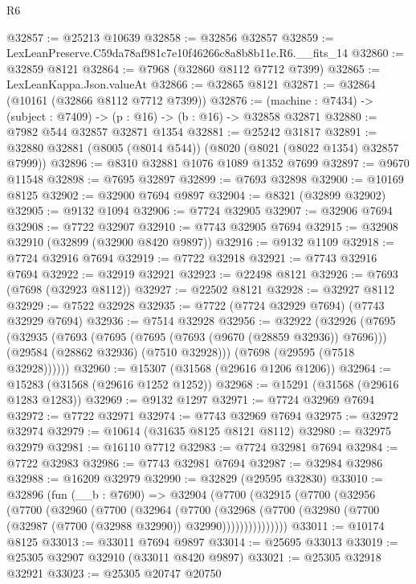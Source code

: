 \begin{lexlean}{R6}
\begin{coremodule}
@32857 := @25213 @10639
@32858 := @32856 @32857
@32859 := LexLeanPreserve.C59da78af981c7e10f46266c8a8b8b11e.R6.__fits_14
@32860 := @32859 @8121
@32864 := @7968 (@32860 @8112 @7712 @7399)
@32865 := LexLeanKappa.Json.valueAt
@32866 := @32865 @8121
@32871 := @32864 (@10161 (@32866 @8112 @7712 @7399))
@32876 := (machine : @7434) -> (subject : @7409) -> (p : @16) -> (b : @16) -> @32858 @32871
@32880 := @7982 @544 @32857 @32871 @1354
@32881 := @25242 @31817
@32891 := @32880 @32881 (@8005 (@8014 @544)) (@8020 (@8021 (@8022 @1354) @32857 @7999))
@32896 := @8310 @32881 @1076 @1089 @1352 @7699
@32897 := @9670 @11548
@32898 := @7695 @32897
@32899 := @7693 @32898
@32900 := @10169 @8125
@32902 := @32900 @7694 @9897
@32904 := @8321 (@32899 @32902)
@32905 := @9132 @1094
@32906 := @7724 @32905
@32907 := @32906 @7694
@32908 := @7722 @32907
@32910 := @7743 @32905 @7694
@32915 := @32908 @32910 (@32899 (@32900 @8420 @9897))
@32916 := @9132 @1109
@32918 := @7724 @32916 @7694
@32919 := @7722 @32918
@32921 := @7743 @32916 @7694
@32922 := @32919 @32921
@32923 := @22498 @8121
@32926 := @7693 (@7698 (@32923 @8112))
@32927 := @22502 @8121
@32928 := @32927 @8112
@32929 := @7522 @32928
@32935 := @7722 (@7724 @32929 @7694) (@7743 @32929 @7694)
@32936 := @7514 @32928
@32956 := @32922
    (@32926
      (@7695
        (@32935
          (@7693
            (@7695 (@7695 (@7693 (@9670 (@28859 @32936)) @7696)))
            (@29584 (@28862 @32936) (@7510 @32928)))
          (@7698 (@29595 (@7518 @32928))))))
@32960 := @15307 (@31568 (@29616 @1206 @1206))
@32964 := @15283 (@31568 (@29616 @1252 @1252))
@32968 := @15291 (@31568 (@29616 @1283 @1283))
@32969 := @9132 @1297
@32971 := @7724 @32969 @7694
@32972 := @7722 @32971
@32974 := @7743 @32969 @7694
@32975 := @32972 @32974
@32979 := @10614 (@31635 @8125 @8121 @8112)
@32980 := @32975 @32979
@32981 := @16110 @7712
@32983 := @7724 @32981 @7694
@32984 := @7722 @32983
@32986 := @7743 @32981 @7694
@32987 := @32984 @32986
@32988 := @16209 @32979
@32990 := @32829 (@29595 @32830)
@33010 := @32896
    (fun (__b : @7690) =>
    @32904
      (@7700
        (@32915
          (@7700
            (@32956
              (@7700
                (@32960
                  (@7700
                    (@32964
                      (@7700
                        (@32968
                          (@7700
                            (@32980 (@7700 (@32987 (@7700 (@32988 @32990)) @32990)))))))))))))))
@33011 := @10174 @8125
@33013 := @33011 @7694 @9897
@33014 := @25695 @33013
@33019 := @25305 @32907 @32910 (@33011 @8420 @9897)
@33021 := @25305 @32918 @32921
@33023 := @25305 @20747 @20750

\end{coremodule}
\end{lexlean}
